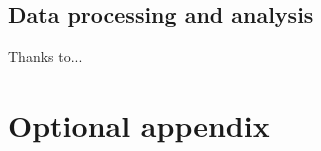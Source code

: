 \documentclass[preprint]{JASAnew}
\begin{document}
\subsection{Data processing and
analysis}\label{data-processing-and-analysis}

\begin{acknowledgments}
Thanks to...
\end{acknowledgments}

\appendix
\section{Optional appendix}










\end{document}

